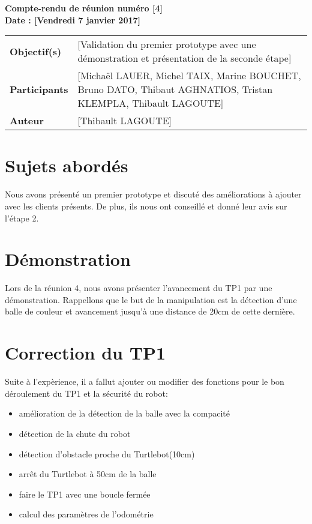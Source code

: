 \documentclass[a4wide,10pt]{article}
\begin{document}
\thispagestyle{empty}

\begin{center}
\LARGE \bfseries  Compte-rendu de réunion numéro [4] \\
\large \bfseries  Date : [Vendredi 7 janvier 2017]

\vspace{0.33cm}
\end{center}

\begin{center}
\begin{tabular}{ p{2.2cm}  p{13.6cm} }
\textbf{Objectif(s)} & [Validation du premier prototype avec une démonstration et présentation de la seconde étape]  \\
\textbf{Participants} & [Michaël LAUER, Michel TAIX, Marine BOUCHET, Bruno DATO, Thibaut AGHNATIOS, Tristan KLEMPLA, Thibault LAGOUTE] \\ 
\textbf{Auteur} & [Thibault LAGOUTE]  \\
\end{tabular}
\end{center}

\section*{Sujets abordés}

Nous avons présenté un premier prototype et discuté des améliorations à ajouter avec les clients présents. De plus, ils nous ont conseillé et donné leur avis sur l'étape 2.


\section*{Démonstration}


Lors de la réunion 4, nous avons présenter l'avancement du TP1 par une démonstration. Rappellons que le but de la manipulation est la détection d'une balle de couleur et avancement jusqu'à une distance de 20cm de cette dernière. \\  
	

\section*{Correction du TP1}

Suite à l'expèrience, il a fallut ajouter ou modifier des fonctions pour le bon déroulement du TP1 et la sécurité du robot:

\begin{itemize}
\item amélioration de la détection de la balle avec la compacité
\item détection de la chute du robot
\item détection d'obstacle proche du Turtlebot(10cm)
\item arrêt du Turtlebot à 50cm de la balle
\item faire le TP1 avec une boucle fermée 
\item calcul des paramètres de l'odométrie
\end{itemize}
\end{document}
